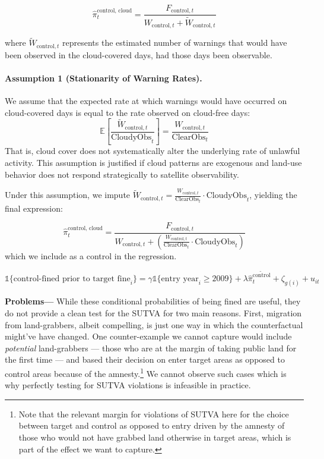 \documentclass[12pt]{article}
\begin{document}
\begin{equation}
\widehat{\pi}^{\text{control, cloud}}_t
= \frac{F_{\text{control}, t}}{W_{\text{control}, t} + \widetilde{W}_{\text{control}, t}}
\end{equation}

\noindent where $\widetilde{W}_{\text{control}, t}$ represents the estimated number of warnings that would have been observed in the cloud-covered days, had those days been observable.

\paragraph{Assumption 1 (Stationarity of Warning Rates).}
We assume that the expected rate at which warnings would have occurred on cloud-covered days is equal to the rate observed on cloud-free days:
\[
\mathbb{E}\left[\frac{\widetilde{W}_{\text{control}, t}}{\text{CloudyObs}_t}\right]
=
\frac{W_{\text{control}, t}}{\text{ClearObs}_t}
\]
That is, cloud cover does not systematically alter the underlying rate of unlawful activity. This assumption is justified if cloud patterns are exogenous and land-use behavior does not respond strategically to satellite observability. 

\bigskip

\noindent Under this assumption, we impute $\widetilde{W}_{\text{control}, t} = \frac{W_{\text{control}, t}}{\text{ClearObs}_t} \cdot \text{CloudyObs}_t$, yielding the final expression:

\begin{equation*}
\widehat{\pi}^{\text{control, cloud}}_t
=
\frac{F_{\text{control}, t}}{
W_{\text{control}, t} + \left( \frac{W_{\text{control}, t}}{\text{ClearObs}_t} \cdot \text{CloudyObs}_t \right)
}
\end{equation*}
which we include as a control in the regression.

\begin{equation*}
\mathbb{1}\{\text{control-fined prior to target fine}_i\}
= \gamma \mathbb{1}\{\text{entry year}_i \geq 2009\} + \lambda \widehat{\pi}_{t}^{\widetilde{\text{control}}}+ \zeta_{g(i)} + u_{it}
\end{equation*}

\clearpage


\quad \textbf{Problems---} While these conditional probabilities of being fined are useful, they do not provide a clean test for the SUTVA for two main reasons. First, migration from land-grabbers, albeit compelling, is just one way in which the counterfactual might've have changed. One counter-example we cannot capture would include \textit{potential} land-grabbers --- those who are at the margin of taking public land for the first time --- and based their decision on enter target areas as opposed to control areas because of the amnesty.\footnote{Note that the relevant margin for violations of SUTVA here for the choice between target and control as opposed to entry driven by the amnesty of those who would not have grabbed land otherwise in target areas, which is part of the effect we want to capture.} We cannot observe such cases which is why perfectly testing for SUTVA violations is infeasible in practice. 
\ 
\end{document}

